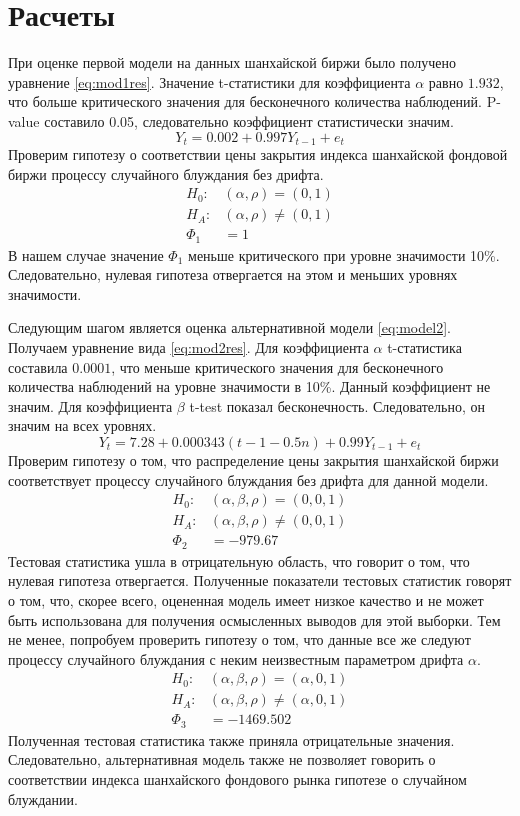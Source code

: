 \documentclass[a4paper,12pt]{article}
\begin{document}
\section{Расчеты}\label{sec:quant}
При оценке первой модели на данных шанхайской биржи было получено уравнение \ref{eq:mod1res}. Значение t-статистики для коэффициента $\alpha$ равно $1.932$, что больше критического значения для бесконечного количества наблюдений. P-value составило 0.05, следовательно коэффициент статистически значим.
  \begin{equation}
    \label{eq:mod1res}
    Y_t=0.002+0.997Y_{t-1}+e_t
  \end{equation}
Проверим гипотезу о соответствии цены закрытия индекса шанхайской фондовой биржи процессу случайного блуждания без дрифта.
\begin{align}
  H_0:&(\alpha,\rho)=(0,1)\\
  H_A:&(\alpha,\rho)\neq(0,1)\\
  \Phi_1&=1
\end{align}
В нашем случае значение $\Phi_1$ меньше критического при уровне значимости 10\%. Следовательно, нулевая гипотеза отвергается на этом и меньших уровнях значимости.

Следующим шагом является оценка альтернативной модели \ref{eq:model2}. Получаем уравнение вида \ref{eq:mod2res}. Для коэффициента $\alpha$ t-статистика составила $0.0001$, что меньше критического значения для бесконечного количества наблюдений на уровне значимости в 10\%. Данный коэффициент не значим. Для коэффициента $\beta$ t-test показал бесконечность. Следовательно, он значим на всех уровнях.
\begin{equation}
  \label{eq:mod2res}
  Y_t=7.28+0.000343(t-1-0.5n)+0.99Y_{t-1}+e_t
\end{equation}
Проверим гипотезу о том, что распределение цены закрытия шанхайской биржи соответствует процессу случайного блуждания без дрифта для данной модели.
\begin{align}
  H_0:&(\alpha, \beta, \rho)=(0,0,1)\\
  H_A:&(\alpha,\beta, \rho)\neq(0,0,1)\\
  \Phi_2&=-979.67
\end{align}
Тестовая статистика ушла в отрицательную область, что говорит о том, что нулевая гипотеза отвергается. Полученные показатели тестовых статистик говорят о том, что, скорее всего, оцененная модель имеет низкое качество и не может быть использована для получения осмысленных выводов для этой выборки. Тем не менее, попробуем проверить гипотезу о том, что данные все же следуют процессу случайного блуждания с неким неизвестным параметром дрифта $\alpha$.
\begin{align}
  H_0:&(\alpha, \beta, \rho)=(\alpha,0,1)\\
  H_A:&(\alpha,\beta, \rho)\neq(\alpha,0,1)\\
  \Phi_3&=-1469.502
\end{align}
Полученная тестовая статистика также приняла отрицательные значения. Следовательно, альтернативная модель также не позволяет говорить о соответствии индекса шанхайского фондового рынка гипотезе о случайном блуждании.
\end{document}
